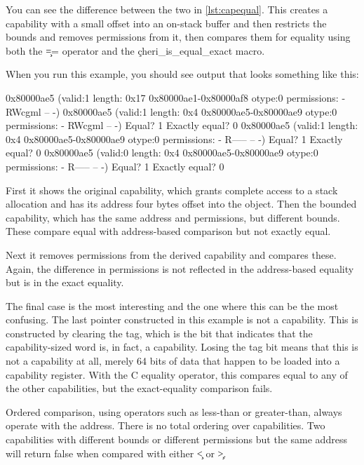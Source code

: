 {{{{{{{{You can see the difference between the two in \ref{lst:capequal}.
This creates a capability with a small offset into an on-stack buffer and then restricts the bounds and removes permissions from it, then compares them for equality using both the \c{==} operator and the \c{cheri_is_equal_exact} macro.

\codelisting[filename=examples/compare_capabilities/example.c,marker=capability_equality,label=lst:capequal,caption="Comparing two capabilities for equality."]{}

When you run this example, you should see output that looks something like this:

\begin{console}
0x80000ae5 (valid:1 length: 0x17 0x80000ae1-0x80000af8 otype:0 permissions: - RWcgml -- -)
0x80000ae5 (valid:1 length: 0x4 0x80000ae5-0x80000ae9 otype:0 permissions: - RWcgml -- -)
Equal? 1
Exactly equal? 0
0x80000ae5 (valid:1 length: 0x4 0x80000ae5-0x80000ae9 otype:0 permissions: - R----- -- -)
Equal? 1
Exactly equal? 0
0x80000ae5 (valid:0 length: 0x4 0x80000ae5-0x80000ae9 otype:0 permissions: - R----- -- -)
Equal? 1
Exactly equal? 0
\end{console}

First it shows the original capability, which grants complete access to a stack allocation and has its address four bytes offset into the object.
Then the bounded capability, which has the same address and permissions, but different bounds.
These compare equal with address-based comparison but not exactly equal.

Next it removes permissions from the derived capability and compares these.
Again, the difference in permissions is not reflected in the address-based equality but is in the exact equality.

The final case is the most interesting and the one where this can be the most confusing.
The last pointer constructed in this example is not a capability.
This is constructed by clearing the tag, which is the bit that indicates that the capability-sized word is, in fact, a capability.
Losing the tag bit means that this is not a capability at all, merely 64 bits of data that happen to be loaded into a capability register.
With the C equality operator, this  compares equal to any of the other capabilities, but the exact-equality comparison fails.

Ordered comparison, using operators such as less-than or greater-than, always operate with the address.
There is no total ordering over capabilities.
Two capabilities with different bounds or different permissions but the same address will return false when compared with either \c{<} or \c{>}.

}}}}}}}}
